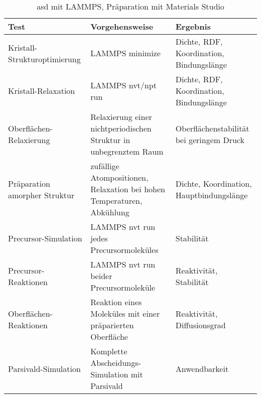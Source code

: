 \begin{table}
  \oddrowcolors
  \begin{tabularx}{\textwidth}{|lXX|}
    \hline
    \textbf{Test}                 & \textbf{Vorgehensweise}                                                & \textbf{Ergebnis}                        \\
    \hline
    Kristall-Strukturoptimierung  & LAMMPS minimize                                                        & Dichte, RDF, Koordination, Bindungslänge \\
    Kristall-Relaxation           & LAMMPS nvt/npt run                                                     & Dichte, RDF, Koordination, Bindungslänge \\
    Oberflächen-Relaxierung       & Relaxierung einer nichtperiodischen Struktur in unbegrenztem Raum      & Oberflächenstabilität bei geringem Druck \\
    Präparation amorpher Struktur & zufällige Atompositionen, Relaxation bei hohen Temperaturen, Abkühlung & Dichte, Koordination, Hauptbindungslänge \\
    Precursor-Simulation          & LAMMPS nvt run jedes Precursormoleküles                                & Stabilität                               \\
    Precursor-Reaktionen          & LAMMPS nvt run beider Precursormoleküle                                & Reaktivität, Stabilität                  \\
    Oberflächen-Reaktionen        & Reaktion eines Moleküles mit einer präparierten Oberfläche             & Reaktivität, Diffusionsgrad              \\
    Parsivald-Simulation          & Komplette Abscheidungs-Simulation mit Parsivald                        & Anwendbarkeit                            \\
    \hline
  \end{tabularx}
  \caption[asd]{asd mit LAMMPS, Präparation mit Materials Studio}
  \label{tab:mdtestvariants}
\end{table}
